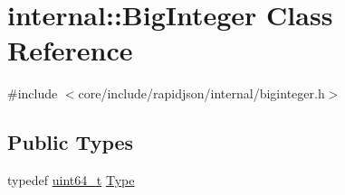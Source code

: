 \hypertarget{classinternal_1_1BigInteger}{}\section{internal\+:\+:Big\+Integer Class Reference}
\label{classinternal_1_1BigInteger}


{\ttfamily \#include $<$core/include/rapidjson/internal/biginteger.\+h$>$}

\subsection*{Public Types}
\begin{DoxyCompactItemize}
\item 
typedef \hyperlink{stdint_8h_aec6fcb673ff035718c238c8c9d544c47}{uint64\+\_\+t} \hyperlink{classinternal_1_1BigInteger_a1310812fca26ebae77594ba08678fc4c}{Type}
\end{DoxyCompactItemize}
